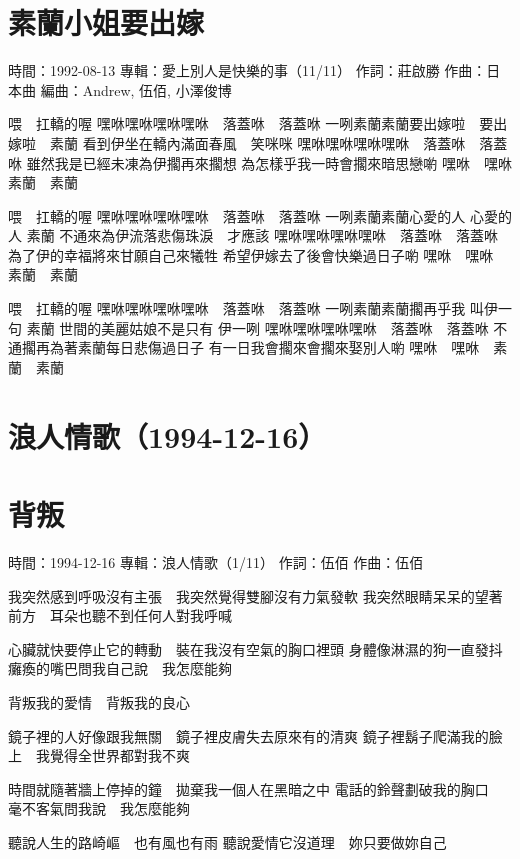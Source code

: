 \documentclass[UTF8,a4paper,oneside,twocolumn,12pt]{ctexbook}
\newcommand{\infopair}[2]{\textbullet #1：#2}
\newcommand{\zc}[1][伍佰]{\infopair{作詞}{#1}}
\newcommand{\zq}[1][伍佰]{\infopair{作曲}{#1}}
\newcommand{\bq}[1][伍佰]{\infopair{編曲}{#1}}
\newcommand{\zj}[1]{\infopair{專輯}{#1}}
\newcommand{\sj}[1]{\infopair{時間}{#1}}
\newenvironment{info}{\begin{flushleft}\kaishu
	}
	{\end{flushleft}\normalsize\yahei\par}
\newenvironment{lyric}{
	}
{}
\begin{document}
\section{素蘭小姐要出嫁}
\begin{info}
	\sj{1992-08-13}
	\zj{愛上別人是快樂的事（11/11）}
	\zc[莊啟勝]
	\zq[日本曲]
	\bq[Andrew, 伍佰, 小澤俊博]
\end{info}
\begin{lyric}
	喂　扛轎的喔
	嘿咻嘿咻嘿咻嘿咻　落蓋咻　落蓋咻
	一咧素蘭素蘭要出嫁啦　要出嫁啦　素蘭
	看到伊坐在轎內滿面春風　笑咪咪
	嘿咻嘿咻嘿咻嘿咻　落蓋咻　落蓋咻
	雖然我是已經未凍為伊擱再來擱想
	為怎樣乎我一時會擱來暗思戀喲
	嘿咻　嘿咻　素蘭　素蘭

	喂　扛轎的喔
	嘿咻嘿咻嘿咻嘿咻　落蓋咻　落蓋咻
	一咧素蘭素蘭心愛的人 心愛的人 素蘭
	不通來為伊流落悲傷珠淚　才應該
	嘿咻嘿咻嘿咻嘿咻　落蓋咻　落蓋咻
	為了伊的幸福將來甘願自己來犧牲
	希望伊嫁去了後會快樂過日子喲
	嘿咻　嘿咻　素蘭　素蘭

	喂　扛轎的喔
	嘿咻嘿咻嘿咻嘿咻　落蓋咻　落蓋咻
	一咧素蘭素蘭擱再乎我 叫伊一句 素蘭
	世間的美麗姑娘不是只有 伊一咧
	嘿咻嘿咻嘿咻嘿咻　落蓋咻　落蓋咻
	不通擱再為著素蘭每日悲傷過日子
	有一日我會擱來會擱來娶別人喲
	嘿咻　嘿咻　素蘭　素蘭
\end{lyric}

\section*{浪人情歌（1994-12-16）}
\section{背叛}
\begin{info}
	\sj{1994-12-16}
	\zj{浪人情歌（1/11）}
	\zc
	\zq
\end{info}
\begin{lyric}
	我突然感到呼吸沒有主張　我突然覺得雙腳沒有力氣發軟
	我突然眼睛呆呆的望著前方　耳朵也聽不到任何人對我呼喊

	心臟就快要停止它的轉動　裝在我沒有空氣的胸口裡頭
	身體像淋濕的狗一直發抖　癱瘓的嘴巴問我自己說　我怎麼能夠

	背叛我的愛情　背叛我的良心

	鏡子裡的人好像跟我無關　鏡子裡皮膚失去原來有的清爽
	鏡子裡鬍子爬滿我的臉上　我覺得全世界都對我不爽

	時間就隨著牆上停掉的鐘　拋棄我一個人在黑暗之中
	電話的鈴聲劃破我的胸口　毫不客氣問我說　我怎麼能夠

	聽說人生的路崎嶇　也有風也有雨
	聽說愛情它沒道理　妳只要做妳自己

\end{lyric}
\end{document}
